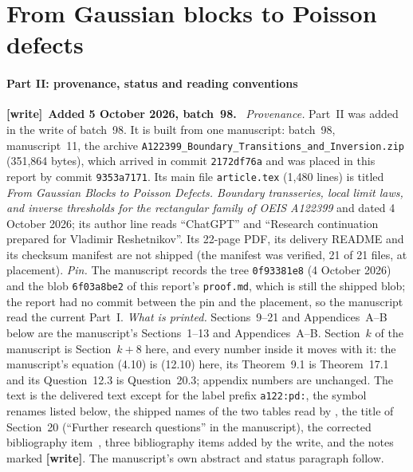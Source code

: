 \documentclass[11pt,letterpaper]{article}
\newenvironment{writenote}[1][]{\par\smallskip\begingroup\small
 \noindent\textbf{[write]}\if\relax\detokenize{#1}\relax\else~\textbf{#1.}\fi\ }%
 {\par\endgroup\smallskip}
\numberwithin{equation}{subsection}
\theoremstyle{definition}
\theoremstyle{remark}
\theoremstyle{plain}
\begin{document}
\clearpage
\part{From Gaussian blocks to Poisson defects}\label{a122:pd:part}

\subsection{Part II: provenance, status and reading conventions}\label{a122:pd:front}

\begin{writenote}[Added 5 October 2026, batch~98]
\emph{Provenance.} Part~II was added in the write of batch~98. It is
built from one manuscript: batch~98, manuscript~11, the archive
\nolinkurl{A122399_Boundary_Transitions_and_Inversion.zip} (351{,}864
bytes), which arrived in commit \texttt{2172df76a} and was placed in this
report by commit \texttt{9353a7171}. Its main file
\nolinkurl{article.tex} (1{,}480 lines) is titled \emph{From Gaussian
Blocks to Poisson Defects. Boundary transseries, local limit laws, and
inverse thresholds for the rectangular family of OEIS A122399} and dated
4 October 2026; its author line reads ``ChatGPT'' and ``Research
continuation prepared for Vladimir Reshetnikov''. Its 22-page PDF, its
delivery README and its checksum manifest are not shipped (the manifest
was verified, 21 of 21 files, at placement).
\emph{Pin.} The manuscript records the tree \texttt{0f93381e8}
(4 October 2026) and the blob \texttt{6f03a8be2} of this report's
\nolinkurl{proof.md}, which is still the shipped blob; the report had no
commit between the pin and the placement, so the manuscript read the
current Part~I.
\emph{What is printed.} Sections~9--21 and Appendices~A--B below are the
manuscript's Sections~1--13 and Appendices~A--B. Section~$k$ of the
manuscript is Section~$k+8$ here, and every number inside it moves with
it: the manuscript's equation (4.10) is (12.10) here, its Theorem~9.1 is
Theorem~17.1 and its Question~12.3 is Question~20.3; appendix numbers are
unchanged. The text is the delivered text except for the label prefix
\texttt{a122:pd:}, the symbol renames listed below, the shipped names of
the two tables read by \verb||, the title of Section~20 (``Further
research questions'' in the manuscript), the corrected bibliography
item~\cite{a122:pd:repo}, three bibliography items added by the write,
and the notes marked \textbf{[write]}. The manuscript's own abstract and
status paragraph follow.
\end{writenote}
\end{document}
